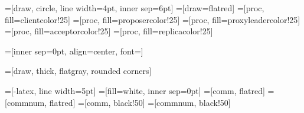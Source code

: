 =[draw, circle, line width=4pt, inner sep=6pt]
=[draw=flatred]
=[proc, fill=clientcolor!25]
=[proc, fill=proposercolor!25]
=[proc, fill=proxyleadercolor!25]
=[proc, fill=acceptorcolor!25]
=[proc, fill=replicacolor!25]

=[inner sep=0pt, align=center, font=\small]

=[draw, thick, flatgray, rounded corners]

=[-latex, line width=5pt]
=[fill=white, inner sep=0pt]
=[comm, flatred]
=[commnum, flatred]
=[comm, black!50]
=[commnum, black!50]


